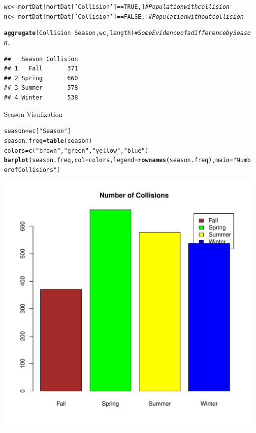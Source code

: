 \documentclass{article}\usepackage[]{graphicx}\usepackage[]{color}
\makeatletter
\def\maxwidth{ %
  \ifdim\Gin@nat@width>\linewidth
    \linewidth
  \else
    \Gin@nat@width
  \fi
}
\newcommand{\hlnum}[1]{\textcolor[rgb]{0.686,0.059,0.569}{#1}}%
\newcommand{\hlstr}[1]{\textcolor[rgb]{0.192,0.494,0.8}{#1}}%
\newcommand{\hlcom}[1]{\textcolor[rgb]{0.678,0.584,0.686}{\textit{#1}}}%
\newcommand{\hlopt}[1]{\textcolor[rgb]{0,0,0}{#1}}%
\newcommand{\hlstd}[1]{\textcolor[rgb]{0.345,0.345,0.345}{#1}}%
\newcommand{\hlkwb}[1]{\textcolor[rgb]{0.69,0.353,0.396}{#1}}%
\newcommand{\hlkwc}[1]{\textcolor[rgb]{0.333,0.667,0.333}{#1}}%
\newcommand{\hlkwd}[1]{\textcolor[rgb]{0.737,0.353,0.396}{\textbf{#1}}}%
\newenvironment{kframe}{%
 \def\at@end@of@kframe{}%
 \ifinner\ifhmode%
  \def\at@end@of@kframe{\end{minipage}}%
  \begin{minipage}{\columnwidth}%
 \fi\fi%
 \def\FrameCommand##1{\hskip\@totalleftmargin \hskip-\fboxsep
 \colorbox{shadecolor}{##1}\hskip-\fboxsep
     \hskip-\linewidth \hskip-\@totalleftmargin \hskip\columnwidth}%
 \MakeFramed {\advance\hsize-\width
   \@totalleftmargin\z@ \linewidth\hsize
   \@setminipage}}%
 {\par\unskip\endMakeFramed%
 \at@end@of@kframe}
\newenvironment{knitrout}{}{} %
\makeatother
\begin{document}
\begin{knitrout}
\color{fgcolor}\begin{kframe}
\begin{alltt}
\hlstd{wc} \hlkwb{<-} \hlstd{mortDat[mortDat[}\hlstr{'Collision'}\hlstd{]} \hlopt{==} \hlnum{TRUE}\hlstd{, ]}  \hlcom{#Population with collision}
\hlstd{nc} \hlkwb{<-} \hlstd{mortDat[mortDat[}\hlstr{'Collision'}\hlstd{]} \hlopt{==} \hlnum{FALSE}\hlstd{, ]} \hlcom{#Population without collision}

\hlkwd{aggregate}\hlstd{(Collision} \hlopt{~} \hlstd{Season, wc, length)} \hlcom{#Some Evidence of a difference by Season. }
\end{alltt}
\begin{verbatim}
##   Season Collision
## 1   Fall       371
## 2 Spring       660
## 3 Summer       578
## 4 Winter       538
\end{verbatim}
\end{kframe}
\end{knitrout}
Season Visulization
\begin{knitrout}
\color{fgcolor}\begin{kframe}
\begin{alltt}
\hlstd{season} \hlkwb{=} \hlstd{wc[}\hlstr{"Season"}\hlstd{]}
\hlstd{season.freq} \hlkwb{=} \hlkwd{table}\hlstd{(season)}
\hlstd{colors} \hlkwb{=} \hlkwd{c}\hlstd{(}\hlstr{"brown"}\hlstd{,} \hlstr{"green"}\hlstd{,} \hlstr{"yellow"}\hlstd{,} \hlstr{"blue"}\hlstd{)}
\hlkwd{barplot}\hlstd{(season.freq,} \hlkwc{col}\hlstd{=colors,}        \hlkwc{legend} \hlstd{=} \hlkwd{rownames}\hlstd{(season.freq),} \hlkwc{main}\hlstd{=}\hlstr{"Number of Collisions "}\hlstd{)}
\end{alltt}
\end{kframe}
\includegraphics[width=\maxwidth]{figure/unnamed-chunk-16-1} 

\end{knitrout}
\end{document}
